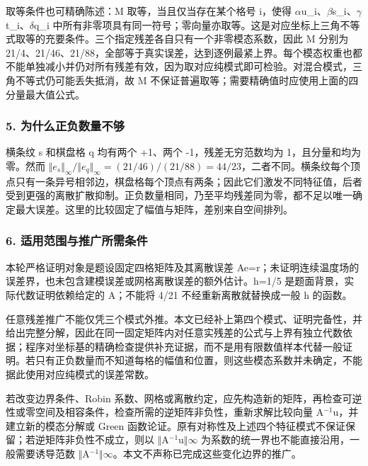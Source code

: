 \documentclass[UTF8,a4paper,11pt]{ctexart}
\begin{document}
取等条件也可精确陈述：M 取等，当且仅当存在某个格号 i，使得 \ensuremath{\alpha }u\_i、\ensuremath{\beta }s\_i、\ensuremath{\gamma }t\_i、\ensuremath{\delta }q\_i 中所有非零项具有同一符号；零向量亦取等。这是对应坐标上三角不等式取等的充要条件。三个指定残差各自只有一个非零模态系数，因此 M 分别为 21/4、21/46、21/88，全部等于真实误差，达到逐例最紧上界。每个模态权重也都不能单独减小并仍对所有残差有效，因为取对应纯模式即可检验。对混合模式，三角不等式仍可能丢失抵消，故 M 不保证普遍取等；需要精确值时应使用上面的四分量最大值公式。

\subsubsection*{5. 为什么正负数量不够}

横条纹 s 和棋盘格 q 均有两个 +1、两个 -1，残差无穷范数均为 1，且分量和均为零。然而 \(\Vert e_s\Vert_{\infty}/\Vert e_q\Vert_{\infty}=(21/46)/(21/88)=44/23\)，二者不同。横条纹每个顶点只有一条异号相邻边，棋盘格每个顶点有两条；因此它们激发不同特征值，后者受到更强的离散扩散抑制。正负数量相同，乃至平均残差同为零，都不足以唯一确定最大误差。这里的比较固定了幅值与矩阵，差别来自空间排列。

\subsubsection*{6. 适用范围与推广所需条件}

本轮严格证明对象是题设固定四格矩阵及其离散误差 Ae=r；未证明连续温度场的误差界，也未包含建模误差或网格离散误差的额外估计。h=1/5 是题面背景，实际代数证明依赖给定的 A；不能将 4/21 不经重新离散就替换成一般 h 的函数。

任意残差推广不能仅凭三个模式外推。本文已经补上第四个模式、证明完备性，并给出完整分解，因此在同一固定矩阵内对任意实残差的公式与上界有独立代数依据；程序对坐标基的精确检查提供补充证据，而不是用有限数值样本代替一般证明。若只有正负数量而不知道每格的幅值和位置，则这些模态系数并未确定，不能据此使用对应纯模式的误差常数。

若改变边界条件、Robin 系数、网格或离散约定，应先构造新的矩阵，再检查可逆性或零空间及相容条件，检查所需的逆矩阵非负性，重新求解比较向量 A\ensuremath{{}^{-1}}u，并建立新的模态分解或 Green 函数论证。原有对称性及上述四个特征模式不保证保留；若逆矩阵非负性不成立，则以 \ensuremath{\Vert }A\ensuremath{{}^{-1}}u\ensuremath{\Vert }\ensuremath{\infty } 为系数的统一界也不能直接沿用，一般需要诱导范数 \ensuremath{\Vert }A\ensuremath{{}^{-1}}\ensuremath{\Vert }\ensuremath{\infty }。本文不声称已完成这些变化边界的推广。
\end{document}
